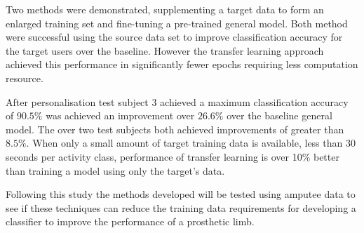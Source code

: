 Two methods were demonstrated, supplementing a target data to form an enlarged training set and fine-tuning a pre-trained general model. Both method were successful using the source data set to improve classification accuracy for the target users over the baseline. However the transfer learning approach achieved this performance in significantly fewer epochs requiring less computation resource.

After personalisation test subject 3 achieved a maximum classification accuracy of $90.5\%$ was achieved an improvement over $26.6\%$ over the baseline general model. The over two test subjects both achieved improvements of greater than $8.5\%$. When only a small amount of target training data is available, less than 30 seconds per activity class, performance of transfer learning is over 10\% better than training a model using only the target's data.

Following this study the methods developed will be tested using amputee data to see if these techniques can reduce the training data requirements for developing a classifier to improve the performance of a prosthetic limb.